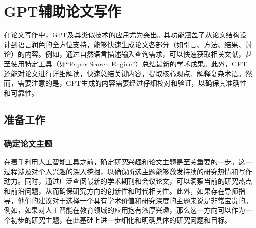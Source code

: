 \section{GPT辅助论文写作}

在论文写作中，GPT及其类似技术的应用尤为突出。其功能涵盖了从论文结构设计到语言润色的全方位支持，能够快速生成论文各部分（如引言、方法、结果、讨论）的内容。例如，通过自然语言描述输入查询需求，可以快速获取相关文献，甚至使用特定工具（如“Paper Search Engine”）总结最新的学术成果。此外，GPT还能对论文进行详细解读，快速总结关键内容，提取核心观点，解释复杂术语。然而，需要注意的是，GPT生成的内容需要经过仔细校对和验证，以确保其准确性和可靠性。

\subsection{准备工作}
\subsubsection{确定论文主题}

在着手利用人工智能工具之前，确定研究兴趣和论文主题是至关重要的一步。这一过程涉及对个人兴趣的深入挖掘，以确保所选主题能够激发持续的研究热情和写作动力。同时，通过广泛查阅最新的学术期刊和会议论文，可以洞察当前的研究热点和前沿问题，从而确保研究方向的创新性和时代相关性。此外，如果存在导师指导，他们的建议对于选择一个具有学术价值和研究深度的主题来说是非常宝贵的。例如，如果对人工智能在教育领域的应用抱有浓厚兴趣，那么这一方向可以作为一个初步的研究主题，在此基础上进一步细化和明确具体的研究问题和目标。


